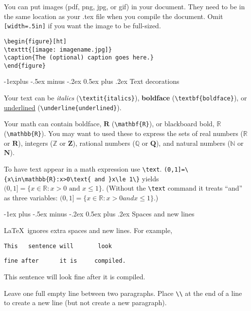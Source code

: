 \documentclass[10pt,landscape]{article}
\makeatletter
\renewcommand{\section}{\@startsection{section}{1}{0mm}%
                                {-1ex plus -.5ex minus -.2ex}%
                                {0.5ex plus .2ex}%
                                {\normalfont\large\bfseries}}
\renewcommand{\subsection}{\@startsection{subsection}{2}{0mm}%
                                {-1explus -.5ex minus -.2ex}%
                                {0.5ex plus .2ex}%
                                {\normalfont\normalsize\bfseries}}
\makeatother
\begin{document}
\begin{multicols}{3}
    You can put images (pdf, png, jpg, or gif) in your document. They need to be in the same location as your .tex file when you compile the document. Omit   \verb![width=.5in]! if you want the image to be full-sized.

    \verb!\begin{figure}[ht]!\\
    \verb!\texttt{[image: imagename.jpg]}!\\
    \verb!\caption{The (optional) caption goes here.}!\\
    \verb!\end{figure}!


    \subsection{Text decorations}

    Your text can be \textit{italics} (\verb!\textit{italics}!), \textbf{boldface} (\verb!\textbf{boldface}!), or \underline{underlined} (\verb!\underline{underlined}!).

    Your math can contain boldface, $\mathbf{R}$ (\verb!\mathbf{R}!), or blackboard bold, $\mathbb{R}$ (\verb!\mathbb{R}!). You may want to used these to express the sets of real numbers ($\mathbb{R}$ or $\mathbf{R}$), integers ($\mathbb{Z}$ or $\mathbf{Z}$), rational numbers ($\mathbb{Q}$ or $\mathbf{Q}$), and natural numbers ($\mathbb{N}$ or $\mathbf{N}$).

    To have text appear in a math expression use \verb!\text!. \verb!(0,1]=\{x\in\mathbb{R}:x>0\text{ and }x\le 1\}! yields $(0,1]=\{x\in\mathbb{R}:x>0\text{ and }x\le 1\}$. (Without the \verb!\text! command it treats ``and'' as three variables: $(0,1]=\{x\in\mathbb{R}:x>0 and x\le 1\}$.)



    \section{Spaces and new lines}

    \LaTeX\ ignores extra spaces and new lines. For example,

    \verb!This   sentence will       look!

    \verb!fine after      it is     compiled.!

    This   sentence will       look
    fine after      it is     compiled.


    Leave one full empty line between two paragraphs. Place \verb!\\! at the end of a line to create a new line (but not create a new paragraph).


\end{multicols}
\end{document}

